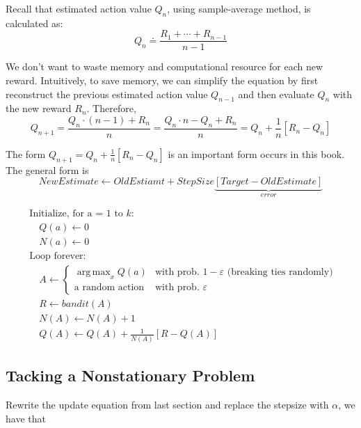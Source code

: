 \documentclass[lang=en,mode=geye,device=normal,color=blue,14pt]{elegantnote}
\DeclareMathOperator*{\1}{\mathbbm{1}}
\DeclareMathOperator*{\argmax}{arg\,max}
\begin{document}
Recall that estimated action value $Q_n$, using sample-average method, is calculated as:
$$ Q_n \doteq \frac{R_1 + \cdots + R_{n-1}}{n-1} $$

We don't want to waste memory and computational resource for each new reward.
Intuitively, to save memory, we can simplify the equation by first reconstruct the previous estimated action value $Q_{n-1}$ and then evaluate $Q_n$ with the new reward $R_n$.
Therefore,
$$ Q_{n+1} = \frac{Q_n \cdot (n-1) + R_n}{n} = \frac{Q_n \cdot n - Q_n + R_n}{n} = Q_n + \frac{1}{n}[R_n - Q_n] $$

The form $Q_{n+1} = Q_n + \frac{1}{n}[R_n - Q_n]$ is an important form occurs in this book. The general form is
$$ NewEstimate \leftarrow OldEstiamt + StepSize\underbrace{[Target - OldEstimate]}_{error} $$

\begin{tcolorbox}[width=\textwidth,title={A simple bandit algorithm}]
	\begin{align*}
	   & \text{Initialize, for a = 1 to }k: \\
	   & \quad Q(a) \leftarrow 0 \\
	   & \quad N(a) \leftarrow 0 \\
	   & \text{Loop forever: }\\
	   & \quad A \leftarrow \left\{
	    \begin{array}{ll}
	        \argmax_x Q(a) & \text{with prob. } 1 - \varepsilon \text{ (breaking ties randomly) }\\
	        \text{a random action} & \text{with prob. } \varepsilon
	    \end{array}
	\right. \\
	   & \quad R \leftarrow bandit(A) \\
	   & \quad N(A) \leftarrow N(A) + 1 \\
	   & \quad Q(A) \leftarrow Q(A) + \frac{1}{N(A)}[R-Q(A)]
	\end{align*}
\end{tcolorbox}

\subsection{Tacking a Nonstationary Problem}

Rewrite the update equation from last section and replace the stepsize with $\alpha$, we have that
\end{document}
